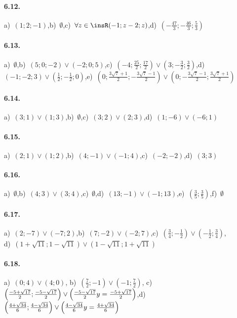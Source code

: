\paragraph{6.12.} a)~$\left(1;2;-1\right)$,\quad b)~$\emptyset $,\quad c)~$\forall z \in \insR (-1;z-2;z)$,\quad d)~$\left(-\frac{47} 3;-\frac{46} 3;\frac 5 3\right)$

\paragraph{6.13.} a)~$\emptyset $,\quad b)~$\left(5;0;-2\right)\vee \left(-2;0;5\right)$,\quad c)~$\left(-4;\frac{25} 2;\frac{17} 2\right)\vee \left(3;-\frac 3 2;\frac 3 2\right)$,\quad d)~$\left(-1;-2;3\right)\vee \left(\frac 1 2;-\frac 1 2;0\right)$,\quad e)~$\left(0;\frac{3\sqrt 7+1} 2;-\frac{3\sqrt 7-1} 2\right)\vee \left(0;-\frac{3\sqrt 7-1} 2;\frac{3\sqrt 7+1} 2\right)$

\paragraph{6.14.} a)~$(3;1)\vee(1;3)$,\quad b)~$\emptyset $,\quad c)~$(3;2)\vee(2;3)$,\quad d)~$(1;-6)\vee(-6;1)$

\paragraph{6.15.} a)~$(2;1)\vee(1;2)$,\quad b)~$(4;-1)\vee(-1;4)$,\quad c)~$(-2;-2)$,\quad d)~$(3;3)$

\paragraph{6.16.} a)~$\emptyset $,\quad b)~$(4;3)\vee(3;4)$,\quad c)~$\emptyset $,\quad d)~$(13;-1)\vee(-1;13)$,\quad e)~$\left(\frac 3 5;\frac 3 5\right)$,\quad f)~$\emptyset $

\paragraph{6.17.} a)~$(2;-7)\vee(-7;2)$,\quad b)~$(7;-2)\vee(-2;7)$,\quad c)~$\left(\frac 3 4;-\frac 1 2\right)\vee\left(-\frac 1 2;\frac 3 4\right)$,\protect\\
\quad d)~$\left(1+\sqrt{11};1-\sqrt{11}\right)\vee\left(1-\sqrt{11};1+\sqrt{11}\right)$

\paragraph{6.18.} a)~$(0;4)\vee(4;0)$,\; b)~$\left(\frac 7 2;-1\right)\vee\left(-1;\frac 7 2\right)$,\; c)~$\left(\frac{-5+\sqrt{17}} 2;\frac{-5-\sqrt{17}} 2\right)\vee \left(\frac{-5-\sqrt{17}} 2\\y=\frac{-5+\sqrt{17}} 2\right)$,\quad d)~$\left(\frac{4+\sqrt{34}} 6;\frac{4-\sqrt{34}} 6\right)\vee \left(\frac{4-\sqrt{34}} 6\\y=\frac{4+\sqrt{34}} 6\right)$

